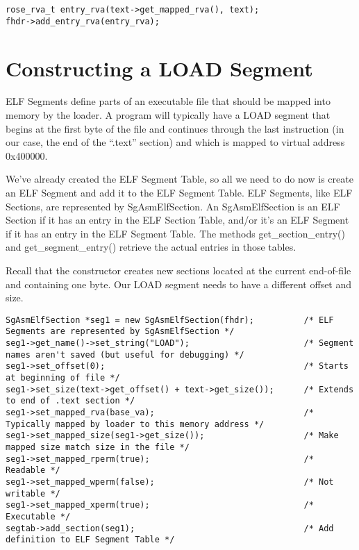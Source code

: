 \begin{verbatim}
rose_rva_t entry_rva(text->get_mapped_rva(), text);
fhdr->add_entry_rva(entry_rva);
\end{verbatim}

\section{Constructing a LOAD Segment}

ELF Segments define parts of an executable file that should be mapped
into memory by the loader.  A program will typically have a LOAD
segment that begins at the first byte of the file and continues
through the last instruction (in our case, the end of the ``.text''
section) and which is mapped to virtual address 0x400000.

We've already created the ELF Segment Table, so all we need to do now
is create an ELF Segment and add it to the ELF Segment Table. ELF
Segments, like ELF Sections, are represented by SgAsmElfSection. An
SgAsmElfSection is an ELF Section if it has an entry in the ELF
Section Table, and/or it's an ELF Segment if it has an entry in the
ELF Segment Table. The methods get_section_entry() and
get_segment_entry() retrieve the actual entries in those tables.

Recall that the constructor creates new sections located at the
current end-of-file and containing one byte. Our LOAD segment needs to
have a different offset and size.

\begin{verbatim}
SgAsmElfSection *seg1 = new SgAsmElfSection(fhdr);          /* ELF Segments are represented by SgAsmElfSection */
seg1->get_name()->set_string("LOAD");                       /* Segment names aren't saved (but useful for debugging) */
seg1->set_offset(0);                                        /* Starts at beginning of file */
seg1->set_size(text->get_offset() + text->get_size());      /* Extends to end of .text section */
seg1->set_mapped_rva(base_va);                              /* Typically mapped by loader to this memory address */
seg1->set_mapped_size(seg1->get_size());                    /* Make mapped size match size in the file */
seg1->set_mapped_rperm(true);                               /* Readable */
seg1->set_mapped_wperm(false);                              /* Not writable */
seg1->set_mapped_xperm(true);                               /* Executable */
segtab->add_section(seg1);                                  /* Add definition to ELF Segment Table */
\end{verbatim}

